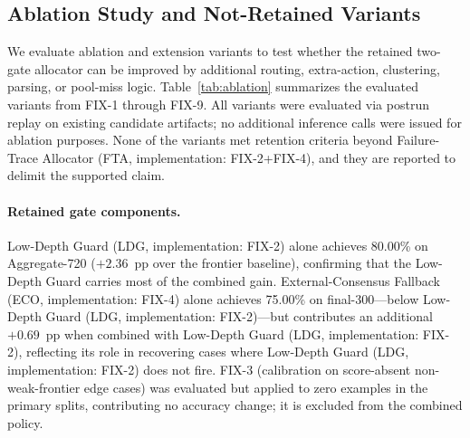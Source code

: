 \subsection{Ablation Study and Not-Retained Variants}
\label{sec:ablation}

We evaluate ablation and extension variants to test whether the retained two-gate
allocator can be improved by additional routing, extra-action, clustering, parsing,
or pool-miss logic.
Table~\ref{tab:ablation} summarizes the evaluated variants from FIX-1 through FIX-9.
All variants were evaluated via postrun replay on existing candidate artifacts;
no additional inference calls were issued for ablation purposes.
None of the variants met retention criteria beyond Failure-Trace Allocator (FTA, implementation: FIX-2+FIX-4), and they are
reported to delimit the supported claim.

\paragraph{Retained gate components.}
Low-Depth Guard (LDG, implementation: FIX-2) alone achieves 80.00\% on Aggregate-720 ($+2.36$~pp over the frontier
baseline), confirming that the Low-Depth Guard carries most of the combined gain.
External-Consensus Fallback (ECO, implementation: FIX-4) alone achieves 75.00\% on final-300---below Low-Depth Guard (LDG, implementation: FIX-2)---but contributes an
additional $+0.69$~pp when combined with Low-Depth Guard (LDG, implementation: FIX-2), reflecting its role in recovering
cases where Low-Depth Guard (LDG, implementation: FIX-2) does not fire.
FIX-3 (calibration on score-absent non-weak-frontier edge cases) was evaluated but applied to
zero examples in the primary splits, contributing no accuracy change; it is
excluded from the combined policy.

